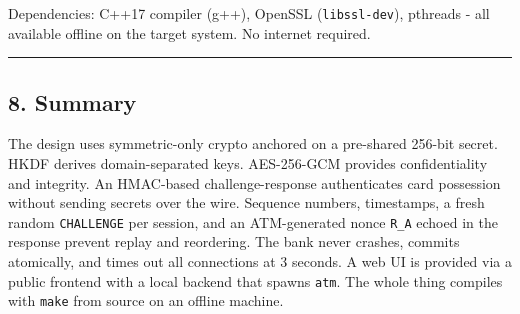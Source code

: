 \documentclass[
]{article}
\begin{document}
Dependencies: C++17 compiler (g++), OpenSSL (\texttt{libssl-dev}),
pthreads - all available offline on the target system. No internet
required.

\begin{center}\rule{0.5\linewidth}{0.5pt}\end{center}

\hypertarget{summary}{%
\subsection{8. Summary}\label{summary}}

The design uses symmetric-only crypto anchored on a pre-shared 256-bit
secret. HKDF derives domain-separated keys. AES-256-GCM provides
confidentiality and integrity. An HMAC-based challenge-response
authenticates card possession without sending secrets over the wire.
Sequence numbers, timestamps, a fresh random \texttt{CHALLENGE} per session,
and an ATM-generated nonce \texttt{R\_A} echoed in the response
prevent replay and reordering. The bank never crashes, commits
atomically, and times out all connections at 3 seconds. A web UI is
provided via a public frontend with a local backend that spawns \texttt{atm}.
The whole thing compiles with \texttt{make} from source on an offline machine.
\end{document}
